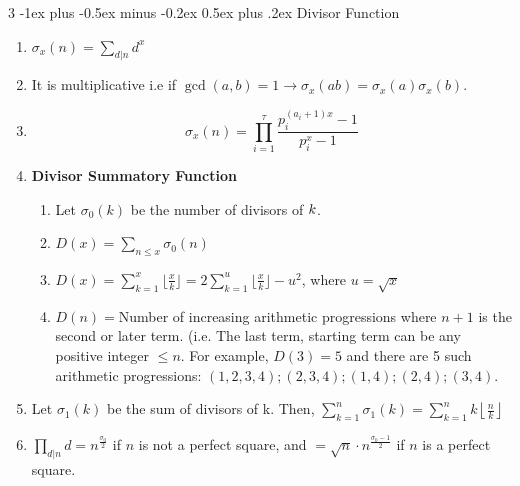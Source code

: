 \documentclass[8pt,a4paper,onesided]{article}
\makeatletter
\renewcommand{\subsection}{\@startsection{subsection}{2}{0mm}
    {-1ex plus -0.5ex minus -0.2ex} %
    {0.5ex plus .2ex}                %
    {\normalfont\large\bfseries}}    %
\makeatother
\begin{document}
\begin{multicols}{3}
\subsection{Divisor Function}
\begin{enumerate}[resume]
    \item $\displaystyle \sigma_x(n)=\sum\limits_{d\vert n}^{}d^x$
    \item It is multiplicative i.e if $\displaystyle \gcd(a, b)=1\to \sigma_x(ab)=\sigma_x(a)\sigma_x(b)$.
    \item \[\displaystyle \sigma_x(n)=\prod\limits_{i=1}^{\tau}\frac{p_i^{(a_i+1)x}-1}{p_i^x-1}\]
    \item \textbf{Divisor Summatory Function}
    \begin{enumerate}
        \item Let $\displaystyle \sigma_0(k)$ be the number of divisors of $\displaystyle \displaystyle k$.
        \item $D(x)=\sum\limits_{n\leq{x}}{\sigma_0(n)}$
        \item $D(x)=\sum\limits_{k=1}^{x}\lfloor\frac{x}{k}\rfloor=2\sum\limits_{k=1}^{u}\lfloor\frac{x}{k}\rfloor-u^2$, where $u=\sqrt{x}$
        \item $D(n)=$Number of increasing arithmetic progressions where $n+1$ is the second or later term. (i.e. The last term, starting term can be any positive integer $\displaystyle \le n$. For example, $D(3)=5$ and there are 5 such arithmetic progressions: $\displaystyle (1, 2, 3, 4); (2, 3, 4); (1, 4); (2, 4); (3, 4).$
    \end{enumerate}
    \item Let $\displaystyle \sigma_1(k)$ be the sum of divisors of k. Then, $\displaystyle \sum\limits_{k=1}^{n}\sigma_1(k)=\sum\limits_{k=1}^{n}{k \left\lfloor \frac{n}{k} \right\rfloor}$
    \item $\displaystyle \prod\limits_{d\vert n}^{}d={n^{\frac{\sigma_0}{2}}}$ if $n$ is not a perfect square, and $=\sqrt{n} \cdot n^{\frac{\sigma_0-1}{2}}$ if $n $ is a perfect square.
\end{enumerate}

\end{multicols}
\end{document}
